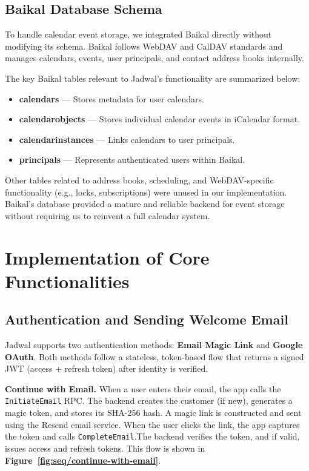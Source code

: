 \subsection{Baikal Database Schema}

To handle calendar event storage, we integrated Baikal directly without modifying its schema. Baikal follows WebDAV and CalDAV standards and manages calendars, events, user principals, and contact address books internally.

The key Baikal tables relevant to Jadwal's functionality are summarized below:

\begin{itemize}
    \item \textbf{calendars} — Stores metadata for user calendars.
    \item \textbf{calendarobjects} — Stores individual calendar events in iCalendar format.
    \item \textbf{calendarinstances} — Links calendars to user principals.
    \item \textbf{principals} — Represents authenticated users within Baikal.
\end{itemize}

Other tables related to address books, scheduling, and WebDAV-specific functionality (e.g., locks, subscriptions) were unused in our implementation. Baikal's database provided a mature and reliable backend for event storage without requiring us to reinvent a full calendar system.


\section{Implementation of Core Functionalities}

\subsection{Authentication and Sending Welcome Email} \label{subsec:authentication}

Jadwal supports two authentication methods: \textbf{Email Magic Link} and \textbf{Google OAuth}. Both methods follow a stateless, token-based flow that returns a signed JWT (access + refresh token) after identity is verified.

\textbf{Continue with Email.} When a user enters their email, the app calls the \texttt{InitiateEmail} RPC.
The backend creates the customer (if new), generates a magic token, and stores its SHA-256 hash.
A magic link is constructed and sent using the Resend email service. When the user clicks the link, the app captures the token and calls \texttt{CompleteEmail}.The backend verifies the token, and if valid, issues access and refresh tokens. This flow is shown in \textbf{Figure~\ref{fig:seq/continue-with-email}}.

